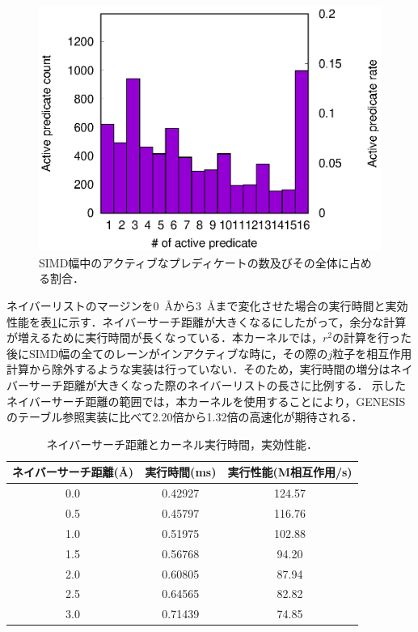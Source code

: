 \documentclass[uplatex,11pt,a4j,titlepage,oneside,openright,dvipdfmx]{jsbook}
\begin{document}
\begin{figure}
 \centering
 \includegraphics[width=12.0cm]{figure/lane_fill_rate.eps}
 \caption[]{SIMD幅中のアクティブなプレディケートの数及びその全体に占める割合．}
 \label{fig:lane_fill_rate}
\end{figure}

ネイバーリストのマージンを\mbox{0 \AA}から\mbox{3 \AA}まで変化させた場合の実行時間と実効性能を表\ref{tab:elapsed_time}に示す．ネイバーサーチ距離が大きくなるにしたがって，余分な計算が増えるために実行時間が長くなっている．本カーネルでは，$r^2$の計算を行った後にSIMD幅の全てのレーンがインアクティブな時に，その際の$j$粒子を相互作用計算から除外するような実装は行っていない．そのため，実行時間の増分はネイバーサーチ距離が大きくなった際のネイバーリストの長さに比例する．
示したネイバーサーチ距離の範囲では，本カーネルを使用することにより，GENESISのテーブル参照実装に比べて2.20倍から1.32倍の高速化が期待される．
 \begin{table}
  \caption{ネイバーサーチ距離とカーネル実行時間，実効性能．}
  \label{tab:elapsed_time}
  \centering
  \begin{tabular}{c c c}
   \hline \hline
   ネイバーサーチ距離(\AA) & 実行時間(ms) & 実行性能(M相互作用/s)\\ \hline
   0.0 & 0.42927 & 124.57\\
   0.5 & 0.45797 & 116.76\\
   1.0 & 0.51975 & 102.88\\
   1.5 & 0.56768 & 94.20\\
   2.0 & 0.60805 & 87.94\\
   2.5 & 0.64565 & 82.82\\
   3.0 & 0.71439 & 74.85\\
   \hline \hline
  \end{tabular}
 \end{table}
\end{document}
